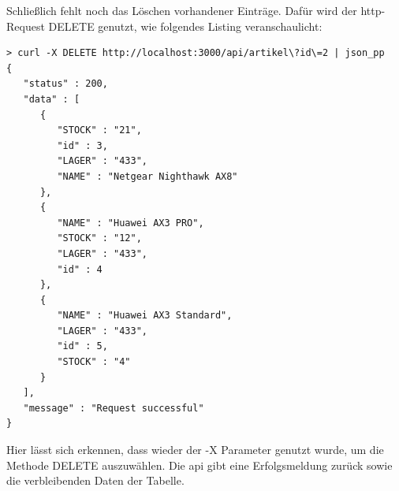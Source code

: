 Schließlich fehlt noch das Löschen vorhandener Einträge. Dafür wird der \gls{http}-Request DELETE genutzt, wie folgendes Listing veranschaulicht:
\newpage
\begin{verbatim}
> curl -X DELETE http://localhost:3000/api/artikel\?id\=2 | json_pp
{
   "status" : 200,
   "data" : [
      {
         "STOCK" : "21",
         "id" : 3,
         "LAGER" : "433",
         "NAME" : "Netgear Nighthawk AX8"
      },
      {
         "NAME" : "Huawei AX3 PRO",
         "STOCK" : "12",
         "LAGER" : "433",
         "id" : 4
      },
      {
         "NAME" : "Huawei AX3 Standard",
         "LAGER" : "433",
         "id" : 5,
         "STOCK" : "4"
      }
   ],
   "message" : "Request successful"
}
\end{verbatim}

Hier lässt sich erkennen, dass wieder der -X Parameter genutzt wurde, um die Methode DELETE auszuwählen. Die \gls{api} gibt eine Erfolgsmeldung zurück  sowie die verbleibenden Daten der Tabelle.